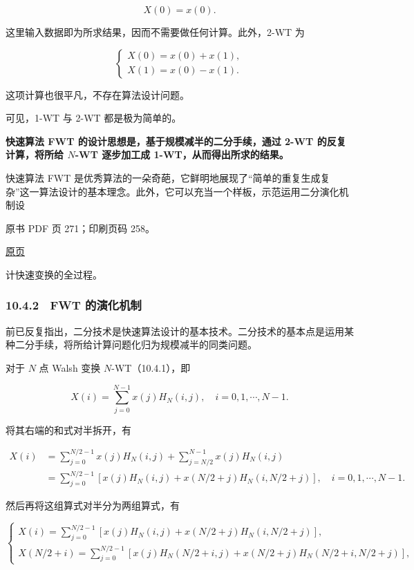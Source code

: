 \[
X(0)=x(0).
\]

这里输入数据即为所求结果，因而不需要做任何计算。此外，2-WT 为

\[
\begin{cases}
X(0)=x(0)+x(1),\\
X(1)=x(0)-x(1).
\end{cases}
\]

这项计算也很平凡，不存在算法设计问题。

可见，1-WT 与 2-WT 都是极为简单的。

\textbf{快速算法 FWT 的设计思想是，基于规模减半的二分手续，通过 2-WT 的反复计算，将所给 \(N\)-WT 逐步加工成 1-WT，从而得出所求的结果。}

快速算法 FWT 是优秀算法的一朵奇葩，它鲜明地展现了``简单的重复生成复杂''这一算法设计的基本理念。此外，它可以充当一个样板，示范运用二分演化机制设

\clearpage

原书 PDF 页 271；印刷页码 258。

\href{source-images/pdf-271.jpeg}{原页}

计快速变换的全过程。

\subsubsection{10.4.2　FWT 的演化机制}\label{ch10-fwt-ux7684ux6f14ux5316ux673aux5236}

前已反复指出，二分技术是快速算法设计的基本技术。二分技术的基本点是运用某种二分手续，将所给计算问题化归为规模减半的同类问题。

对于 \(N\) 点 Walsh 变换 \(N\)-WT（10.4.1），即

\[
X(i)=\sum_{j=0}^{N-1}x(j)H_N(i,j),\quad i=0,1,\cdots,N-1.
\]

将其右端的和式对半拆开，有

\[
\begin{aligned}
X(i)&=\sum_{j=0}^{N/2-1}x(j)H_N(i,j)+\sum_{j=N/2}^{N-1}x(j)H_N(i,j)\\
&=\sum_{j=0}^{N/2-1}[x(j)H_N(i,j)+x(N/2+j)H_N(i,N/2+j)],\quad i=0,1,\cdots,N-1.
\end{aligned}
\]

然后再将这组算式对半分为两组算式，有

\[
\begin{cases}
\displaystyle X(i)=\sum_{j=0}^{N/2-1}[x(j)H_N(i,j)+x(N/2+j)H_N(i,N/2+j)],\\[6pt]
\displaystyle X(N/2+i)=\sum_{j=0}^{N/2-1}[x(j)H_N(N/2+i,j)+x(N/2+j)H_N(N/2+i,N/2+j)],
\end{cases}
\]

